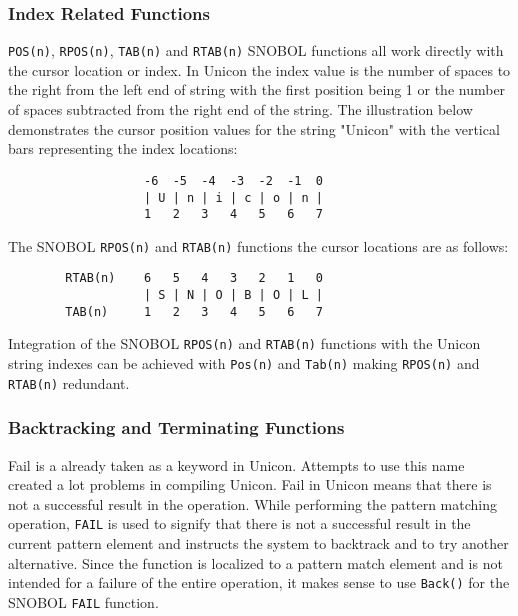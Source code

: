 \documentclass{article}
\begin{document}
\vspace{1 pc}
\subsubsection{Index Related Functions}
\texttt{POS(n)}, \texttt{RPOS(n)}, \texttt{TAB(n)} and \texttt{RTAB(n)} SNOBOL functions all work directly with the cursor location or index.  In Unicon the index value is the number of spaces to the right from the left end of string with the first position being 1 or the number of spaces subtracted from the right end of the string.\cite{JefferyUnicon}   The illustration below demonstrates the cursor position values for the string "Unicon" with the vertical bars representing the index locations:

\begin{verbatim}
                   -6  -5  -4  -3  -2  -1  0
                   | U | n | i | c | o | n |
                   1   2   3   4   5   6   7
\end{verbatim}

The SNOBOL \texttt{RPOS(n)} and \texttt{RTAB(n)} functions the cursor locations are as follows:

\begin{verbatim}
        RTAB(n)    6   5   4   3   2   1   0
                   | S | N | O | B | O | L |
        TAB(n)     1   2   3   4   5   6   7
\end{verbatim}

Integration of the SNOBOL \texttt{RPOS(n)} and \texttt{RTAB(n)} functions with the Unicon string indexes can be achieved with \texttt{Pos(n)} and \texttt{Tab(n)} making \texttt{RPOS(n)} and \texttt{RTAB(n)} redundant.

\vspace{1 pc}
\subsubsection{Backtracking and Terminating Functions}
Fail is a already taken as a keyword in Unicon.  Attempts to use this name created a lot problems in compiling Unicon.  Fail in Unicon means that there is not a successful result in the operation.  While performing the pattern matching operation, \texttt{FAIL} is used to signify that there is not a successful result in the current pattern element and instructs the system to backtrack and to try another alternative.  Since the function is localized to a pattern match element and is not intended for a failure of the entire operation, it makes sense to use \texttt{Back()} for the SNOBOL \texttt{FAIL} function.
\end{document}
